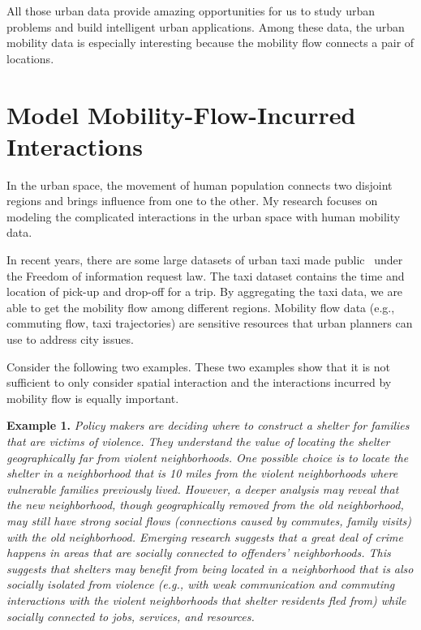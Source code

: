 All those urban data provide amazing opportunities for us to study urban problems and build intelligent urban applications. Among these data, the urban mobility data is especially interesting because the mobility flow connects a pair of locations. 


\section{Model Mobility-Flow-Incurred Interactions}


In the urban space, the movement of human population connects two disjoint regions and brings influence from one to the other. My research focuses on modeling the complicated interactions in the urban space with human mobility data.  


In recent years, there are some large datasets of urban taxi made public~\cite{nyctaxi} under the Freedom of information request law.  The taxi dataset contains the time and location of pick-up and drop-off for a trip. By aggregating the taxi data, we are able to get the mobility flow among different regions.
Mobility flow data (e.g., commuting flow, taxi trajectories) are sensitive resources that urban planners can use to address city issues.




Consider the following two examples. These two examples show that it is not sufficient to only consider spatial interaction and the interactions incurred by mobility flow is equally important.


\textbf{Example 1.} \emph{Policy makers are deciding where to construct a shelter for families that are victims of violence. They understand the value of locating the shelter geographically far from violent neighborhoods. One possible choice is to locate the shelter in a neighborhood that is 10 miles from the violent neighborhoods where vulnerable families previously lived. However, a deeper analysis may reveal that the new neighborhood, though geographically removed from the old neighborhood, may still have strong social flows (connections caused by commutes, family visits) with the old neighborhood. Emerging research suggests that a great deal of crime happens in areas that are socially connected to offenders' neighborhoods. This suggests that shelters may benefit from being located in a neighborhood that is also socially isolated from violence (e.g., with weak communication and commuting interactions with the violent neighborhoods that shelter residents fled from) while socially connected to jobs, services, and resources.}


